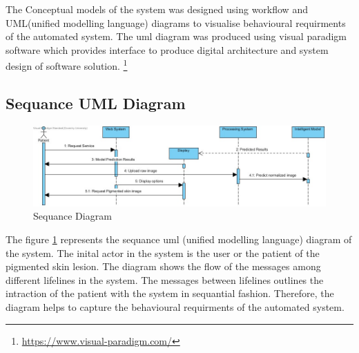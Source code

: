 The Conceptual models of the system was designed using workflow 
and UML(unified modelling language) diagrams to visualise
behavioural requirments of the automated system. 
The uml diagram was produced using visual paradigm software which provides 
interface to produce digital architecture and system design of software solution. \footnote{\url{https://www.visual-paradigm.com/}}

\subsection{Sequance UML Diagram}
\begin{figure}[!htp]
    \centering
    \includegraphics[width=\textwidth]{Images/code.png}
    \caption{Sequance Diagram}
    \label{figure:Sequance}
\end{figure}
The figure \ref{figure:Sequance} represents the sequance uml (unified modelling language) diagram of the 
system. The inital actor in the system is the user or the patient of the 
pigmented skin lesion. The diagram shows the flow of the messages among 
different lifelines in the system. The messages between lifelines outlines the intraction of
the patient with the system in sequantial fashion. Therefore, the diagram helps to capture the 
behavioural requirments of the automated system.
